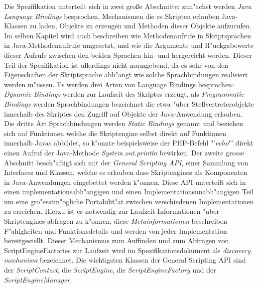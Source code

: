 Die Spezifikation unterteilt sich in zwei gro\ss e Abschnitte: zun"achst werden \emph{Java Language Bindings} besprochen, Mechanismen
die es Skripten erlauben Java-Klassen zu laden, Objekte zu erzeugen und Methoden dieser Objekte aufzurufen. Im selben Kapitel wird
auch beschreiben wie Methodenaufrufe in Skriptsprachen in Java-Methodenaufrufe umgesetzt, und wie die Argumente und 
R"uckgabewerte dieser Aufrufe zwischen den beiden Sprachen hin- und hergereicht werden. Dieser Teil der Spezifikation ist allerdings
nicht normgebend, da es sehr von den Eigenschaften der Skriptsprache abh"angt wie solche Sprachbindungen realisiert werden m"ussen.
Es werden drei Arten von Language Bindings besprochen: \emph{Dynamic Bindings} werden zur Laufzeit des Skriptes erzeugt, als
\emph{Programmatic Bindings} werden Sprachbindungen bezeichnet die etwa "uber Stellvertreterobjekte innerhalb des Skriptes 
den Zugriff auf Objekte der Java-Anwendung erlauben. Die dritte Art Sprachbindungen werden \emph{Static Bindings} genannt und
beziehen sich auf Funktionen welche die Skriptengine selbst direkt auf Funktionen innerhalb Javas abbildet, so k"onnte beispielsweise
der PHP-Befehl "'\emph{echo}"' direkt einen Aufruf der Java-Methode \emph{System.out.println} bewirken.
Der zweite grosse Abschnitt besch"aftigt sich mit der \emph{General Scripting API}, einer Sammlung von Interfaces und Klassen, 
welche es erlauben dass Skriptengines als Komponenten in Java-Anwendungen eingebettet werden k"onnen. Diese API unterteilt sich
in einen implementationsabh"angigen und einen Implementationsunabh"angigen Teil um eine gro"esstm"ogliche Portabilit"at zwischen
verschiedenen Implementationen zu erreichen. Hierzu ist es notwendig zur Laufzeit Informationen "uber Skriptengines abfragen
zu k"onnen, diese \emph{Metainformationen} beschreiben F"ahigkeiten und Funktionsdetails und werden von jeder Implementation bereitgestellt.
Dieser Mechanismus zum Auffinden und zum Abfragen von ScriptEngineFactories zur Laufzeit wird im Spezifikationsdokument 
als \emph{discovery mechanism} bezeichnet.
Die wichtigsten Klassen der General Scripting API sind der \emph{ScriptContext},
die \emph{ScriptEngine}, die \emph{ScriptEngineFactory} und der \emph{ScriptEngineManager}.
